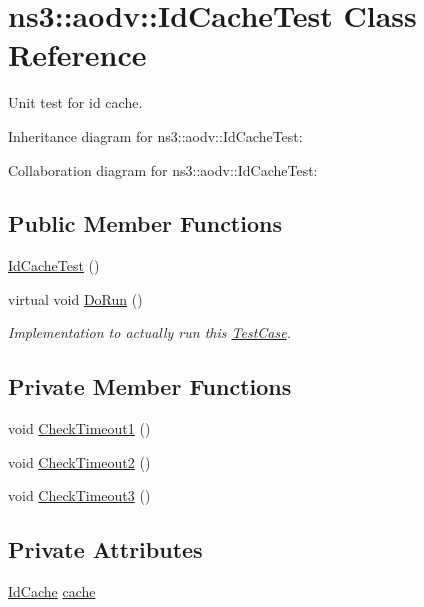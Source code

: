 \hypertarget{classns3_1_1aodv_1_1IdCacheTest}{}\section{ns3\+:\+:aodv\+:\+:Id\+Cache\+Test Class Reference}
\label{classns3_1_1aodv_1_1IdCacheTest}


Unit test for id cache.  




Inheritance diagram for ns3\+:\+:aodv\+:\+:Id\+Cache\+Test\+:


Collaboration diagram for ns3\+:\+:aodv\+:\+:Id\+Cache\+Test\+:
\subsection*{Public Member Functions}
\begin{DoxyCompactItemize}
\item 
\hyperlink{classns3_1_1aodv_1_1IdCacheTest_adcd998c8bd9548995bb81504ce865b73}{Id\+Cache\+Test} ()
\item 
virtual void \hyperlink{classns3_1_1aodv_1_1IdCacheTest_af48af2859e1e63cf946df38906f4d7a2}{Do\+Run} ()
\begin{DoxyCompactList}\small\item\em Implementation to actually run this \hyperlink{classns3_1_1TestCase}{Test\+Case}. \end{DoxyCompactList}\end{DoxyCompactItemize}
\subsection*{Private Member Functions}
\begin{DoxyCompactItemize}
\item 
void \hyperlink{classns3_1_1aodv_1_1IdCacheTest_ac0901557807e3af2e86a367f7f980ae7}{Check\+Timeout1} ()
\item 
void \hyperlink{classns3_1_1aodv_1_1IdCacheTest_ab11c66e1706b2d93636fb51a0ba26b88}{Check\+Timeout2} ()
\item 
void \hyperlink{classns3_1_1aodv_1_1IdCacheTest_a71a8a40ca0fe0f310e4cb2681c245916}{Check\+Timeout3} ()
\end{DoxyCompactItemize}
\subsection*{Private Attributes}
\begin{DoxyCompactItemize}
\item 
\hyperlink{classns3_1_1aodv_1_1IdCache}{Id\+Cache} \hyperlink{classns3_1_1aodv_1_1IdCacheTest_a6cccec1766c0093ff16c3abd92f1579c}{cache}
\end{DoxyCompactItemize}
